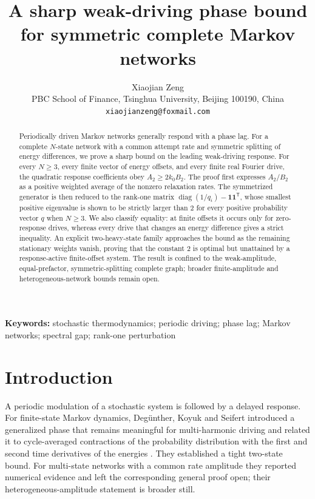\documentclass[11pt]{article}
\title{A sharp weak-driving phase bound for symmetric complete Markov networks}
\author{Xiaojian Zeng\\
\small PBC School of Finance, Tsinghua University, Beijing 100190, China\\
\small \texttt{xiaojianzeng@foxmail.com}}
\date{}
\newcommand{\one}{\bm{1}}
\newcommand{\diag}{\operatorname{diag}}
\begin{document}
\maketitle

\begin{abstract}
Periodically driven Markov networks generally respond with a phase lag.  For a
complete $N$-state network with a common attempt rate and symmetric splitting of
energy differences, we prove a sharp bound on the leading weak-driving response.
For every $N\geq3$, every finite vector of energy offsets, and every finite real
Fourier drive, the quadratic response coefficients obey
$A_2\geq 2k_0B_2$.  The proof first expresses $A_2/B_2$ as a positive weighted
average of the nonzero relaxation rates.  The symmetrized generator is then reduced
to the rank-one matrix $\diag(1/q_i)-\one\one^{\mathsf T}$, whose smallest positive
eigenvalue is shown to be strictly larger than $2$ for every positive probability
vector $q$ when $N\geq3$.  We also classify equality: at finite offsets it occurs
only for zero-response drives, whereas every drive that changes an energy difference
gives a strict inequality.  An explicit two-heavy-state family approaches the bound
as the remaining stationary weights vanish, proving that the constant $2$ is optimal
but unattained by a response-active finite-offset system.  The result is confined to
the weak-amplitude, equal-prefactor, symmetric-splitting complete graph; broader
finite-amplitude and heterogeneous-network bounds remain open.
\end{abstract}

\noindent\textbf{Keywords:} stochastic thermodynamics; periodic driving; phase lag;
Markov networks; spectral gap; rank-one perturbation

\section{Introduction}

A periodic modulation of a stochastic system is followed by a delayed response.
For finite-state Markov dynamics, Deg\"unther, Koyuk and Seifert introduced a
generalized phase that remains meaningful for multi-harmonic driving and related it
to cycle-averaged contractions of the probability distribution with the first and
second time derivatives of the energies \cite{Deguenther2022}.  They established a
tight two-state bound.  For multi-state networks with a common rate amplitude they
reported numerical evidence and left the corresponding general proof open; their
heterogeneous-amplitude statement is broader still.
\end{document}
